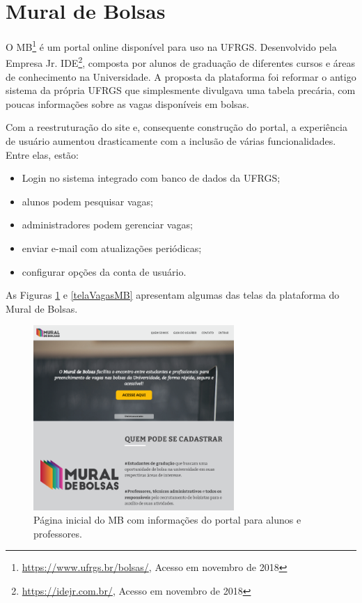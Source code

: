 \section{Mural de Bolsas}
\label{trabRelMDB}

O MB\footnote{{\url{https://www.ufrgs.br/bolsas/}, Acesso em novembro de 2018}} é um portal online disponível para uso na UFRGS. Desenvolvido pela Empresa Jr. IDE\footnote{{\url{https://idejr.com.br/}, Acesso em novembro de 2018}}, composta por alunos de graduação de diferentes cursos e áreas de conhecimento na Universidade. A proposta da plataforma foi reformar o antigo sistema da própria UFRGS que simplesmente divulgava uma tabela precária, com poucas informações sobre as vagas disponíveis em bolsas. 

Com a reestruturação do site e, consequente construção do portal, a experiência de usuário aumentou drasticamente  com a inclusão de várias funcionalidades. Entre elas, estão:
\begin{itemize}
    \item Login no sistema integrado com banco de dados da UFRGS;
    \item alunos podem pesquisar vagas;
    \item administradores podem gerenciar vagas;
    \item enviar e-mail com atualizações periódicas;
    \item configurar opções da conta de usuário.
\end{itemize}

As Figuras \ref{telaHomeMB} e \ref{telaVagasMB} apresentam algumas das telas da plataforma do Mural de Bolsas.

\begin{figure}[H]
    \caption{Página inicial do MB com informações do portal para alunos e professores.}
       	\begin{center}
            \includegraphics[width=0.68\textwidth]{figuras/rel06.png}
        \end{center}
    \label{telaHomeMB}
\end{figure}

